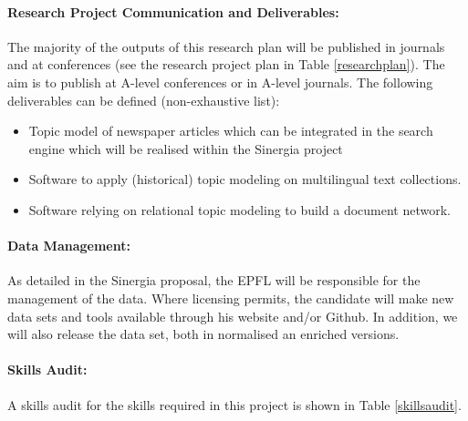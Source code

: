 \paragraph{Research Project Communication and Deliverables:}
The majority of the outputs of this research plan will be published in journals and at conferences (see the research project plan in Table \ref{researchplan}). The aim is to publish at A-level conferences or in A-level journals. The following deliverables can be defined (non-exhaustive list):

\begin{itemize}
	\item Topic model of newspaper articles which can be integrated in the search engine which will be realised within the Sinergia project
	\item Software to apply (historical) topic modeling on multilingual text collections.
	\item Software relying on relational topic modeling to build a document network.
\end{itemize}

\paragraph{Data Management:}
As detailed in the Sinergia proposal, the EPFL will be responsible for the management of the data. Where licensing permits, the candidate will make new data sets and tools available through his website and/or Github. In addition, we will also release the data set, both in normalised an enriched versions.

\paragraph*{Skills Audit:}
A skills audit for the skills required in this project is shown in Table \ref{skillsaudit}.

